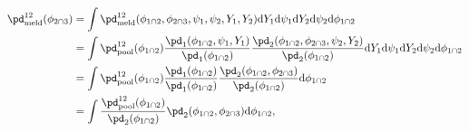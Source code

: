 \begin{align}
  \pd_{\text{meld}}^{12}(\phi_{2 \cap 3}) &=
  \int 
    \pd_{\text{meld}}^{12} (\phi_{1 \cap 2}, \phi_{2 \cap 3}, \psi_{1}, \psi_{2}, Y_{1}, Y_{2}) 
  \text{d} Y_{1}
  \text{d} \psi_{1} 
  \text{d} Y_{2}
  \text{d} \psi_{2}
  \text{d} \phi_{1 \cap 2}
  \\
  &= 
  \int
    \pd_{\text{pool}}^{12}(\phi_{1 \cap 2})
    \frac {
      \pd_{1}(\phi_{1 \cap 2}, \psi_{1}, Y_{1})
    } {
      \pd_{1}(\phi_{1 \cap 2})
    }
    \frac {
      \pd_{2}(\phi_{1 \cap 2}, \phi_{2 \cap 3}, \psi_{2}, Y_{2})
    } {
      \pd_{2}(\phi_{1 \cap 2})
    }
  \text{d} Y_{1}
  \text{d} \psi_{1} 
  \text{d} Y_{2}
  \text{d} \psi_{2}
  \text{d} \phi_{1 \cap 2}
  \\
  &=
  \int
    \pd_{\text{pool}}^{12}(\phi_{1 \cap 2})
    \frac {
      \pd_{1}(\phi_{1 \cap 2})
    } {
      \pd_{1}(\phi_{1 \cap 2})
    }
    \frac {
      \pd_{2}(\phi_{1 \cap 2}, \phi_{2 \cap 3})
    } {
      \pd_{2}(\phi_{1 \cap 2})
    }
  \text{d} \phi_{1 \cap 2} \\
  &= 
  \int
    \frac {
      \pd_{\text{pool}}^{12}(\phi_{1 \cap 2})
    } {
      \pd_{2}(\phi_{1 \cap 2})
    }
      \pd_{2}(\phi_{1 \cap 2}, \phi_{2 \cap 3})
  \text{d} \phi_{1 \cap 2},
  \label{eqn:verify-dictatorial-pooling}
\end{align}